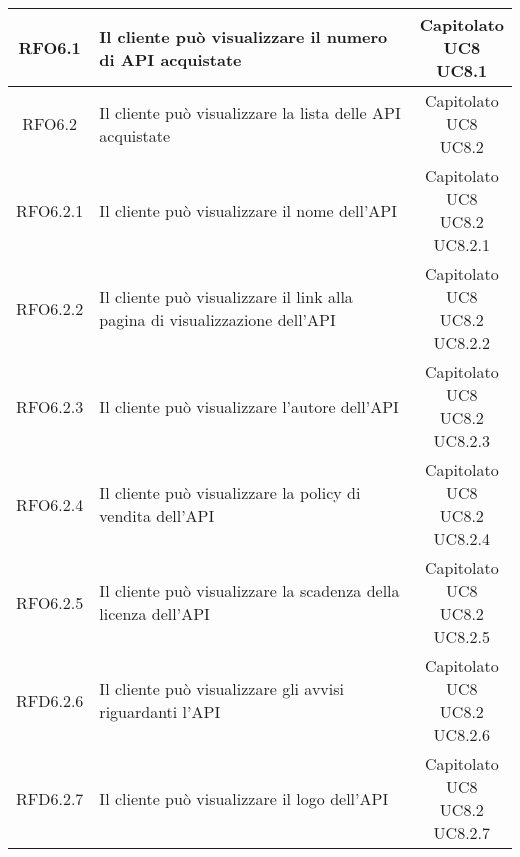 \begin{longtable}{|c|p{8cm}|c|}
\hypertarget{RFO6.1}{RFO6.1} & Il cliente può visualizzare il numero di API acquistate & \makecell*{Capitolato\\UC8\\UC8.1} \\
\hline

\hypertarget{RFO6.2}{RFO6.2} & Il cliente può visualizzare la lista delle API acquistate & \makecell*{Capitolato\\UC8\\UC8.2} \\
\hline

\hypertarget{RFO6.2.1}{RFO6.2.1} & Il cliente può visualizzare il nome dell'API & \makecell*{Capitolato\\UC8\\UC8.2\\UC8.2.1} \\
\hline
\hypertarget{RFO6.2.2}{RFO6.2.2} & Il cliente può visualizzare il link alla pagina di visualizzazione dell'API & \makecell*{Capitolato\\UC8\\UC8.2\\UC8.2.2} \\
\hline
\hypertarget{RFO6.2.3}{RFO6.2.3} & Il cliente può visualizzare l'autore dell'API & \makecell*{Capitolato\\UC8\\UC8.2\\UC8.2.3} \\
\hline
\hypertarget{RFO6.2.4}{RFO6.2.4} & Il cliente può visualizzare la policy di vendita dell'API & \makecell*{Capitolato\\UC8\\UC8.2\\UC8.2.4} \\
\hline
\hypertarget{RFO6.2.5}{RFO6.2.5} & Il cliente può visualizzare la scadenza della licenza dell'API & \makecell*{Capitolato\\UC8\\UC8.2\\UC8.2.5} \\
\hline
\hypertarget{RFD6.2.6}{RFD6.2.6} & Il cliente può visualizzare gli avvisi riguardanti l'API & \makecell*{Capitolato\\UC8\\UC8.2\\UC8.2.6} \\
\hline
\hypertarget{RFD6.2.7}{RFD6.2.7} & Il cliente può visualizzare il logo dell'API & \makecell*{Capitolato\\UC8\\UC8.2\\UC8.2.7} \\
\hline


\end{longtable}
